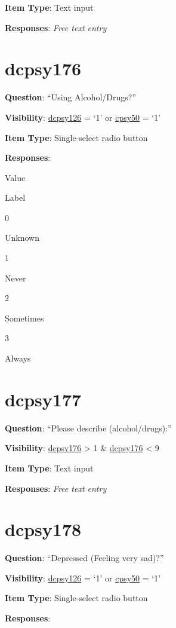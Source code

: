 \documentclass[]{book}
\begin{document}
\textbf{Item Type}: Text input

\textbf{Responses}: \emph{Free text entry}

\hypertarget{dcpsy176}{%
\section{dcpsy176}\label{dcpsy176}}

\textbf{Question}: ``Using Alcohol/Drugs?''

\textbf{Visibility}: \protect\hyperlink{dcpsy126}{dcpsy126} = `1' or \protect\hyperlink{cpsy50}{cpsy50} = `1'

\textbf{Item Type}: Single-select radio button

\textbf{Responses}:

Value

Label

0

Unknown

1

Never

2

Sometimes

3

Always

\hypertarget{dcpsy177}{%
\section{dcpsy177}\label{dcpsy177}}

\textbf{Question}: ``Please describe (alcohol/drugs):''

\textbf{Visibility}: \protect\hyperlink{dcpsy176}{dcpsy176} \textgreater{} 1 \& \protect\hyperlink{dcpsy176}{dcpsy176} \textless{} 9

\textbf{Item Type}: Text input

\textbf{Responses}: \emph{Free text entry}

\hypertarget{dcpsy178}{%
\section{dcpsy178}\label{dcpsy178}}

\textbf{Question}: ``Depressed (Feeling very sad)?''

\textbf{Visibility}: \protect\hyperlink{dcpsy126}{dcpsy126} = `1' or \protect\hyperlink{cpsy50}{cpsy50} = `1'

\textbf{Item Type}: Single-select radio button

\textbf{Responses}:
\end{document}
